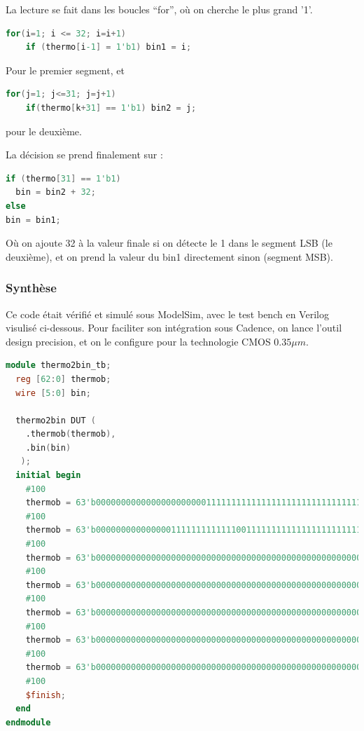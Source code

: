 \documentclass[11pt]{article}
\begin{document}
La lecture se fait dans les boucles ``for'', o\`u on cherche le plus grand '1'.
\begin{lstlisting}[language=Verilog, belowskip=-2 \baselineskip]
 for(i=1; i <= 32; i=i+1)
    if (thermo[i-1] = 1'b1) bin1 = i;
\end{lstlisting}
Pour le premier segment, et
\begin{lstlisting}[language=Verilog, belowskip=-2 \baselineskip]
  for(j=1; j<=31; j=j+1)
    if(thermo[k+31] == 1'b1) bin2 = j;
\end{lstlisting}
pour le deuxi\`eme.

La d\'ecision se prend finalement sur :
\begin{lstlisting}[language=Verilog, belowskip=-2 \baselineskip]
if (thermo[31] == 1'b1)
  bin = bin2 + 32;
else
bin = bin1;
\end{lstlisting}
O\`u on ajoute 32 \`a la valeur finale si on d\'etecte le 1 dans le segment LSB (le deuxi\`eme),
et on prend la valeur du bin1 directement sinon (segment MSB).

\subsubsection{Synth\`ese}

Ce code \'etait v\'erifi\'e et simul\'e sous ModelSim, avec le test bench en Verilog visulis\'e ci-dessous. Pour faciliter son int\'egration sous Cadence, on lance l'outil design precision, et on le configure pour la technologie CMOS $0.35 \mu m$.

\begin{lstlisting}[language=Verilog, belowskip=-2 \baselineskip]
module thermo2bin_tb;
  reg [62:0] thermob;
  wire [5:0] bin;
	
  thermo2bin DUT (
    .thermob(thermob),
    .bin(bin)
   );
  initial begin
    #100
    thermob = 63'b000000000000000000000011111111111111111111111111111111111111111;
    #100
    thermob = 63'b000000000000000111111111111100111111111111111111111111111111111;
    #100
    thermob = 63'b000000000000000000000000000000000000000000000000000000000000000;
    #100
    thermob = 63'b000000000000000000000000000000000000000000000000000000000000001;
    #100
    thermob = 63'b000000000000000000000000000000000000000000000000000000000000100;	
    #100
    thermob = 63'b000000000000000000000000000000000000000000000000000000000000110;
    #100
    thermob = 63'b000000000000000000000000000000000000000000000000000000000000111;
    #100
    $finish;
  end
endmodule
\end{lstlisting}
\end{document}
